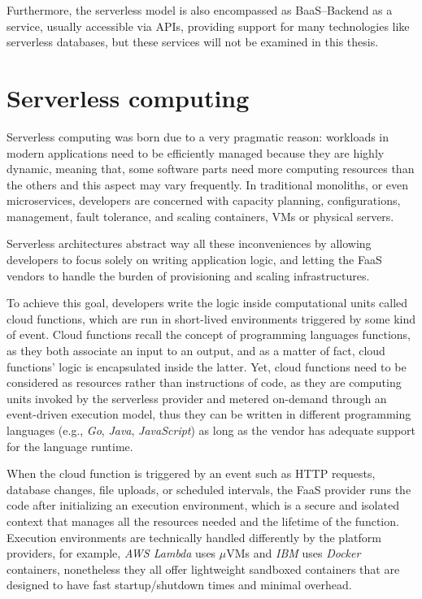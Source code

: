 Furthermore, the serverless model is also encompassed as BaaS--Backend as a service,
usually accessible via APIs, providing support for many technologies like serverless databases,
but these services will not be examined in this thesis.

\section{Serverless computing}

Serverless computing was born due to a very pragmatic reason:
workloads in modern applications need to be efficiently managed
because they are highly dynamic, meaning that, some software parts
need more computing resources than the others and this aspect may vary frequently.
In traditional monoliths, or even microservices, developers are concerned
with capacity planning, configurations, management, fault tolerance, and
scaling containers, VMs or physical servers.

Serverless architectures abstract way all these inconveniences
by allowing developers to focus solely on writing application logic,
and letting the FaaS vendors to handle the burden of provisioning and scaling infrastructures.

To achieve this goal, developers write the logic inside computational units
called cloud functions, which are run in short-lived environments triggered by some kind of event.
Cloud functions recall the concept of programming languages functions,
as they both associate an input to an output, and as a matter of fact, 
cloud functions' logic is encapsulated inside the latter.
Yet, cloud functions need to be considered as resources rather than instructions of code,
as they are computing units invoked by the serverless provider and metered on-demand through an event-driven execution model,
thus they can be written in different programming languages (e.g., \textit{Go}, \textit{Java}, \textit{JavaScript})
as long as the vendor has adequate support for the language runtime.

When the cloud function is triggered by an event such as
HTTP requests, database changes, file uploads, or scheduled intervals,
the FaaS provider runs the code
after initializing an execution environment, which is a secure and isolated context
that manages all the resources needed and the lifetime of the function.
Execution environments are technically handled differently by the platform providers, for example,
\textit{AWS Lambda} uses $\mu$VMs and \textit{IBM} uses \textit{Docker} containers,
nonetheless they all offer lightweight sandboxed containers that are designed to
have fast startup/shutdown times and minimal overhead.


